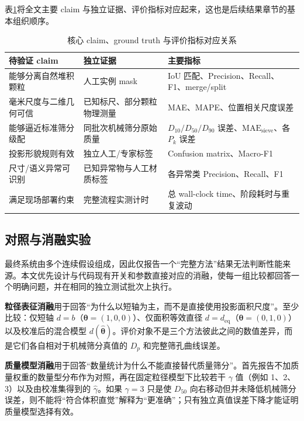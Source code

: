 表\ref{tab:claim-evidence-metric}将全文主要 claim 与独立证据、评价指标对应起来，这也是后续结果章节的基本组织顺序。

\begin{table}[htbp]
\centering
\caption{核心 claim、ground truth 与评价指标对应关系}
\label{tab:claim-evidence-metric}
\footnotesize
\renewcommand{\arraystretch}{1.18}
\begin{tabular}{>{\raggedright\arraybackslash}p{3.3cm}>{\raggedright\arraybackslash}p{4.1cm}>{\raggedright\arraybackslash}p{6.2cm}}
\toprule
待验证 claim & 独立证据 & 主要指标 \\
\midrule
能够分离自然堆积颗粒 & 人工实例 mask & IoU 匹配、Precision、Recall、F1、merge/split \\
毫米尺度与二维几何可信 & 已知标尺、部分颗粒物理测量 & MAE、MAPE、位置相关尺度误差 \\
能够逼近标准筛分级配 & 同批次机械筛分原始质量 & $D_{10}/D_{50}/D_{90}$ 误差、$\mathrm{MAE}_{\mathrm{sieve}}$、各 $P_k$ 误差 \\
投影形貌规则有效 & 独立人工/专家标签 & Confusion matrix、Macro-F1 \\
尺寸/语义异常可识别 & 已知异常物与人工材质标签 & 各异常类 Precision、Recall、F1 \\
满足现场部署约束 & 完整流程实测计时 & 总 wall-clock time、阶段耗时与重复波动 \\
\bottomrule
\end{tabular}
\end{table}

\subsection{对照与消融实验}
\label{sec:ablation-design}

最终系统由多个连续假设组成，因此仅报告一个“完整方法”结果无法判断性能来源。本文优先设计与代码现有开关和参数直接对应的消融，使每一组比较都回答一个明确问题，并在相同的独立测试批次上执行。

\textbf{粒径表征消融}用于回答“为什么以短轴为主，而不是直接使用投影面积尺度”。至少比较：仅短轴 $d=b$（$\boldsymbol{\theta}=(1,0,0)$）、仅面积等效直径 $d=d_{\mathrm{eq}}$（$\boldsymbol{\theta}=(0,1,0)$）以及校准后的混合模型 $d(\widehat{\boldsymbol{\theta}})$。评价对象不是三个方法彼此之间的数值差异，而是它们各自相对于机械筛分真值的 $D_p$ 和完整筛孔曲线误差。

\textbf{质量模型消融}用于回答“数量统计为什么不能直接替代质量筛分”。首先报告不加质量权重的数量型分布作为对照，再在固定粒径模型下比较若干 $\gamma$ 值（例如 1、2、3）以及由校准集得到的 $\widehat{\gamma}$。如果 $\gamma=3$ 只是使 $D_{50}$ 向右移动但并未降低机械筛分误差，则不能将“符合体积直觉”解释为“更准确”；只有独立真值误差下降才能证明质量模型选择有效。

